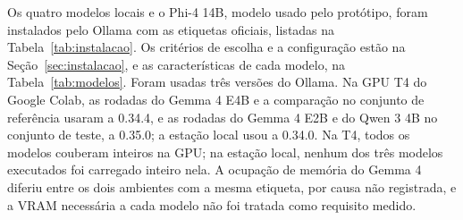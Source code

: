 Os quatro modelos locais e o Phi-4 14B, modelo usado pelo protótipo, foram instalados pelo Ollama com as etiquetas oficiais, listadas na Tabela~\ref{tab:instalacao}. Os critérios de escolha e a configuração estão na Seção~\ref{sec:instalacao}, e as características de cada modelo, na Tabela~\ref{tab:modelos}. Foram usadas três versões do Ollama. Na GPU T4 do Google Colab, as rodadas do Gemma 4 E4B e a comparação no conjunto de referência usaram a 0.34.4, e as rodadas do Gemma 4 E2B e do Qwen 3 4B no conjunto de teste, a 0.35.0; a estação local usou a 0.34.0. Na T4, todos os modelos couberam inteiros na GPU; na estação local, nenhum dos três modelos executados foi carregado inteiro nela. A ocupação de memória do Gemma 4 diferiu entre os dois ambientes com a mesma etiqueta, por causa não registrada, e a VRAM necessária a cada modelo não foi tratada como requisito medido.

